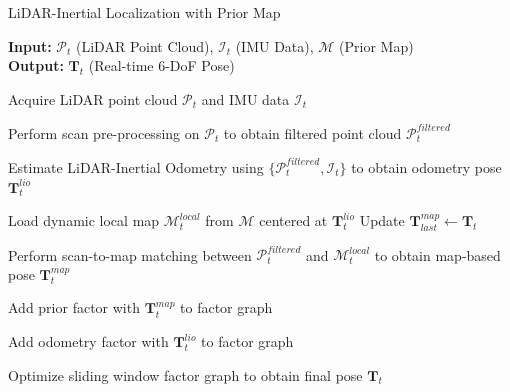 \begin{algorithm}[H]
	\caption{LiDAR-Inertial Localization with Prior Map}
	\label{alg:localization-system}
	
	\textbf{Input:} $\mathcal{P}_t$ (LiDAR Point Cloud), $\mathcal{I}_t$ (IMU Data), $\mathcal{M}$ (Prior Map)\\
	\textbf{Output:} $\mathbf{T}_t$ (Real-time 6-DoF Pose)
	
	\begin{algorithmic}[1]
		
		
		\State Acquire LiDAR point cloud $\mathcal{P}_t$ and IMU data $\mathcal{I}_t$
		
		\State Perform scan pre-processing on $\mathcal{P}_t$ to obtain filtered point cloud $\mathcal{P}_t^{filtered}$
		
		\State Estimate LiDAR-Inertial Odometry using $\{\mathcal{P}_t^{filtered}, \mathcal{I}_t\}$ to obtain odometry pose $\mathbf{T}_t^{lio}$	
		
		\State Load dynamic local map $\mathcal{M}_t^{local}$ from $\mathcal{M}$ centered at $\mathbf{T}_t^{lio}$
		\State Update $\mathbf{T}_{last}^{map} \gets \mathbf{T}_t$
		\EndIf
		
		\State Perform scan-to-map matching between $\mathcal{P}_t^{filtered}$ and $\mathcal{M}_t^{local}$ to obtain map-based pose $\mathbf{T}_t^{map}$
		
		\State Add prior factor with $\mathbf{T}_t^{map}$ to factor graph
		\EndIf
		
		\State Add odometry factor with $\mathbf{T}_t^{lio}$ to factor graph
		
		\State Optimize sliding window factor graph to obtain final pose $\mathbf{T}_t$
		
		\EndWhile
		
	\end{algorithmic}
\end{algorithm}



